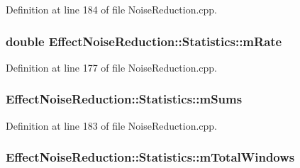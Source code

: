 Definition at line 184 of file Noise\+Reduction.\+cpp.

\subsubsection[{\texorpdfstring{m\+Rate}{mRate}}]{\setlength{\rightskip}{0pt plus 5cm}double Effect\+Noise\+Reduction\+::\+Statistics\+::m\+Rate}\hypertarget{class_effect_noise_reduction_1_1_statistics_a291421ba2374bc0523e69ae9c4d552bf}{}\label{class_effect_noise_reduction_1_1_statistics_a291421ba2374bc0523e69ae9c4d552bf}


Definition at line 177 of file Noise\+Reduction.\+cpp.

\subsubsection[{\texorpdfstring{m\+Sums}{mSums}}]{ Effect\+Noise\+Reduction\+::\+Statistics\+::m\+Sums}\hypertarget{class_effect_noise_reduction_1_1_statistics_af81af8f27eba423cc134bd9b94b7019e}{}\label{class_effect_noise_reduction_1_1_statistics_af81af8f27eba423cc134bd9b94b7019e}


Definition at line 183 of file Noise\+Reduction.\+cpp.

\subsubsection[{\texorpdfstring{m\+Total\+Windows}{mTotalWindows}}]{ Effect\+Noise\+Reduction\+::\+Statistics\+::m\+Total\+Windows}\hypertarget{class_effect_noise_reduction_1_1_statistics_ab17125778a20ce16b8a8bd13b21cfdc3}{}\label{class_effect_noise_reduction_1_1_statistics_ab17125778a20ce16b8a8bd13b21cfdc3}


